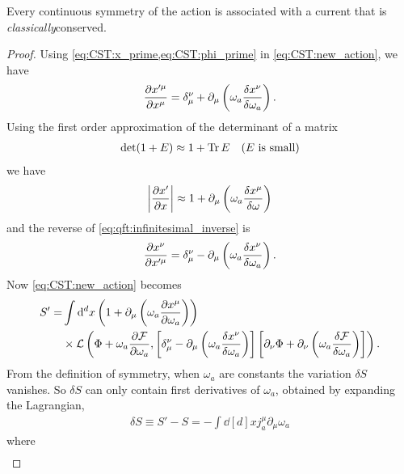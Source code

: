 \documentclass[10pt]{article}
\begin{document}
\begin{theorem}
    Every continuous symmetry of the action is associated with a current that is \textit{classically}\snm conserved. 
\end{theorem}
\begin{proof}
    Using \cref{eq:CST:x_prime,eq:CST:phi_prime} in \cref{eq:CST:new_action}, we have 
    \begin{align}
        \pdv{x'^\mu}{x^\mu}=\delta^\nu_\mu+\partial_\mu\left(\omega_a\fdv{x^\nu}{\omega_a}\right).\label{eq:qft:infinitesimal_inverse}
    \end{align}
    Using the first order approximation of the determinant of a matrix 
    \begin{align}
        \det(1+E)\approx1+\Tr E\quad(E\ \text{is small})
    \end{align}
    we have 
    \begin{align}
        \abs{\pdv{x'}{x}}\approx1+\partial_\mu\left(\omega_a\fdv{x^\mu}{\omega}\right)
    \end{align}
    and the reverse of \cref{eq:qft:infinitesimal_inverse} is 
    \begin{align}
        \pdv{x^\nu}{x'^\mu}=\delta^\nu_\mu-\partial_\mu\left(\omega_a\fdv{x^\nu}{\omega_a}\right).
    \end{align}
    Now \cref{eq:CST:new_action} becomes 
    \begin{align}
        S'=&\int\dd[d]{x}\left(1+\partial_\mu\left(\omega_a\pdv{x^\mu}{\omega_a}\right)\right)\notag\\
            &\times\mathcal{L}\left(\Phi+\omega_a\pdv{\mathcal{F}}{\omega_a},\left[\delta^\nu_\mu-\partial_\mu\left(\omega_a\fdv{x^\nu}{\omega_a}\right)\right]\left[\partial_\nu\Phi+\partial_\nu\left(\omega_a\fdv{\mathcal{F}}{\omega_a}\right)\right]\right).
    \end{align}
    From the definition of symmetry, when $\omega_a$ are constants the variation $\delta S$ vanishes.
    So $\delta S$ can only contain first derivatives of $\omega_a$, obtained by expanding the Lagrangian\snm, 
    \begin{align}
        \delta S\equiv S'-S=-\int\dd[d]{x}j^\mu_a\partial_\mu\omega_a\label{eq:nother:before_integration}
    \end{align}
    where 
    \begin{align}

\end{align}
\end{proof}
\end{document}
